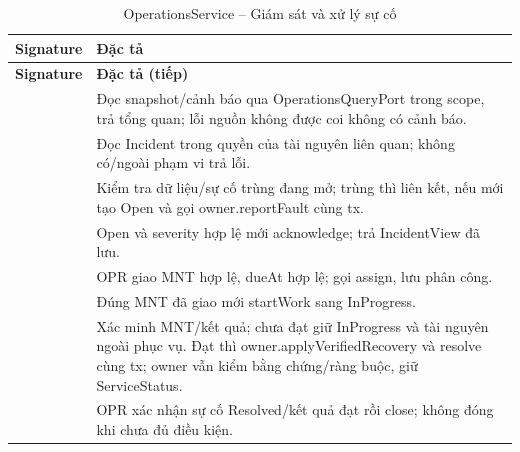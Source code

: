 \begin{longtable}{|L{58mm}|L{81mm}|}
\caption{OperationsService -- Giám sát và xử lý sự cố}\\\hline
\textbf{Signature} & \textbf{Đặc tả}\\\hline
\endfirsthead
\hline\textbf{Signature} & \textbf{Đặc tả (tiếp)}\\\hline\endhead
{} &
Đọc snapshot/cảnh báo qua OperationsQueryPort trong scope, trả tổng quan; lỗi nguồn không được coi không có cảnh báo.\\\hline
{} &
Đọc Incident trong quyền của tài nguyên liên quan; không có/ngoài phạm vi trả lỗi.\\\hline
{} &
Kiểm tra dữ liệu/sự cố trùng đang mở; trùng thì liên kết, nếu mới tạo Open và gọi owner.reportFault cùng tx.\\\hline
{} &
Open và severity hợp lệ mới acknowledge; trả IncidentView đã lưu.\\\hline
{} &
OPR giao MNT hợp lệ, dueAt hợp lệ; gọi assign, lưu phân công.\\\hline
{} &
Đúng MNT đã giao mới startWork sang InProgress.\\\hline
{} &
Xác minh MNT/kết quả; chưa đạt giữ InProgress và tài nguyên ngoài phục vụ. Đạt thì owner.applyVerifiedRecovery và resolve cùng tx; owner vẫn kiểm bằng chứng/ràng buộc, giữ ServiceStatus.\\\hline
{} &
OPR xác nhận sự cố Resolved/kết quả đạt rồi close; không đóng khi chưa đủ điều kiện.\\\hline
\end{longtable}


